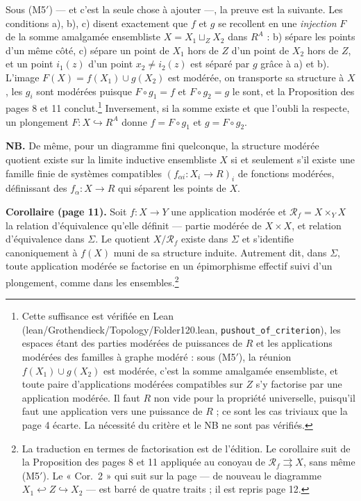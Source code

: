 \documentclass[11pt,a4paper]{article}
\begin{document}
Sous (M5$'$) — et c'est la seule chose à ajouter —, la preuve est la suivante.
Les conditions a), b), c) disent exactement que $f$ et $g$ se recollent en une
\emph{injection} $F$ de la somme amalgamée ensembliste $X = X_1 \sqcup_Z X_2$
dans $R^A$ : b) sépare les points d'un même côté, c) sépare un point de $X_1$
hors de $Z$ d'un point de $X_2$ hors de $Z$, et un point $i_1(z)$ d'un point
$x_2 \neq i_2(z)$ est séparé par $g$ grâce à a) et b). L'image $F(X) = f(X_1)
\cup g(X_2)$ est modérée, on transporte sa structure à $X$, les $g_i$ sont
modérées puisque $F \circ g_1 = f$ et $F \circ g_2 = g$ le sont, et la
Proposition des pages 8 et 11 conclut.\footnote{Cette suffisance est vérifiée
en Lean (lean/Grothendieck/Topology/Folder120.lean, \texttt{pushout\_of\_criterion}),
les espaces étant des parties modérées de puissances de $R$ et les applications
modérées des familles à graphe modéré : sous (M5$'$), la réunion $f(X_1) \cup
g(X_2)$ est modérée, c'est la somme amalgamée ensembliste, et toute paire
d'applications modérées compatibles sur $Z$ s'y factorise par une application
modérée. Il faut $R$ non vide pour la propriété universelle, puisqu'il faut une
application vers une puissance de $R$ ; ce sont les cas triviaux que la page 4
écarte. La nécessité du critère et le NB ne sont pas vérifiés.} Inversement, si la somme existe et que
l'oubli la respecte, un plongement $F : X \hookrightarrow R^A$ donne $f = F
\circ g_1$ et $g = F \circ g_2$.

\textbf{NB.} De même, pour un diagramme fini quelconque, la structure modérée
quotient existe sur la limite inductive ensembliste $X$ si et seulement s'il
existe une famille finie de systèmes compatibles $(f_{\alpha i} : X_i \to
R)_{i}$ de fonctions modérées, définissant des $f_\alpha : X \to R$ qui
séparent les points de $X$.

\textbf{Corollaire (page 11).} Soit $f : X \to Y$ une application modérée et
$\mathcal{R}_f = X \times_Y X$ la relation d'équivalence qu'elle définit —
partie modérée de $X \times X$, et relation d'équivalence dans $\Sigma$. Le
quotient $X / \mathcal{R}_f$ existe dans $\Sigma$ et s'identifie
canoniquement à $f(X)$ muni de sa structure induite. Autrement dit, dans
$\Sigma$, toute application modérée se factorise en un épimorphisme effectif
suivi d'un plongement, comme dans les ensembles.\footnote{La traduction en
termes de factorisation est de l'édition. Le corollaire suit de la Proposition
des pages 8 et 11 appliquée au conoyau de $\mathcal{R}_f \rightrightarrows X$,
sans même (M5$'$). Le « Cor.\ 2 » qui suit sur la page — de nouveau le
diagramme $X_1 \hookleftarrow Z \hookrightarrow X_2$ — est barré de quatre
traits ; il est repris page 12.}
\end{document}
